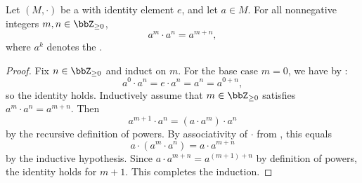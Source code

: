 \begin{lemma} \label{lemma:additivity_of_powers_in_a_monoid}
    Let $(M,\cdot)$ be a  with identity element $e$, and let $a \in M$. For all nonnegative integers $m,n \in \bbZ_{\geq 0}$,
    $$a^m \cdot a^n = a^{m+n},$$
    where $a^k$ denotes the .
\end{lemma}
\begin{proof}
    Fix $n \in \bbZ_{\geq 0}$ and induct on $m$. For the base case $m = 0$, we have by :
    $$a^0 \cdot a^n = e \cdot a^n = a^n = a^{0+n},$$
    so the identity holds. Inductively assume that $m \in \bbZ_{\geq 0}$ satisfies $a^m \cdot a^n = a^{m+n}$. Then
    $$a^{m+1} \cdot a^n = (a \cdot a^m) \cdot a^n$$
    by the recursive definition of powers. By associativity of $\cdot$ from , this equals
    $$a \cdot (a^m \cdot a^n) = a \cdot a^{m+n}$$
    by the inductive hypothesis. Since $a \cdot a^{m+n} = a^{(m+1)+n}$ by definition of powers, the identity holds for $m+1$. This completes the induction.
\end{proof}
